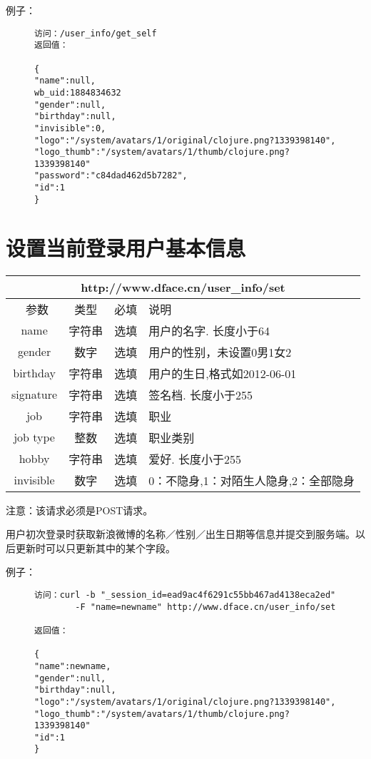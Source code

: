 \documentclass[cs4size]{ctexartutf8}
\begin{document}
例子：

\begin{figure}[H]
\begin{verbatim}
访问：/user_info/get_self
返回值：

{
"name":null,
wb_uid:1884834632
"gender":null,
"birthday":null,
"invisible":0,
"logo":"/system/avatars/1/original/clojure.png?1339398140",
"logo_thumb":"/system/avatars/1/thumb/clojure.png?1339398140"
"password":"c84dad462d5b7282",
"id":1
}

\end{verbatim}
\end{figure}



\section{设置当前登录用户基本信息}

\begin{table}[H]
   \begin{center}
\begin{tabular}{|c|c|c|p{12cm}|}
\hline
\multicolumn{4}{|c|}{http://www.dface.cn/user\_info/set} \\
\hline\hline
 \  参数  & 类型 & 必填 &  说明  \\
\hline
 name  & 字符串 & 选填 &  用户的名字. 长度小于64\\
\hline
 gender  & 数字 & 选填 &  用户的性别，未设置0男1女2\\
\hline
 birthday  & 字符串 & 选填 &  用户的生日,格式如2012-06-01\\
 \hline
 signature  & 字符串 & 选填 &  签名档. 长度小于255\\
 \hline
 job  & 字符串 & 选填 &  职业\\
 \hline
 job type  & 整数 & 选填 &  职业类别\\
 \hline
 hobby  & 字符串 & 选填 &  爱好. 长度小于255\\
 \hline
 invisible  & 数字 & 选填 &  0：不隐身,1：对陌生人隐身,2：全部隐身\\
\hline
\end{tabular}
   \end{center}
\end{table}

注意：该请求必须是POST请求。

用户初次登录时获取新浪微博的名称／性别／出生日期等信息并提交到服务端。以后更新时可以只更新其中的某个字段。

例子：

\begin{figure}[H]
\begin{verbatim}
访问：curl -b "_session_id=ead9ac4f6291c55bb467ad4138eca2ed" 
        -F "name=newname" http://www.dface.cn/user_info/set

返回值：

{
"name":newname,
"gender":null,
"birthday":null,
"logo":"/system/avatars/1/original/clojure.png?1339398140",
"logo_thumb":"/system/avatars/1/thumb/clojure.png?1339398140"
"id":1
}

\end{verbatim}
\end{figure}
\end{document}
